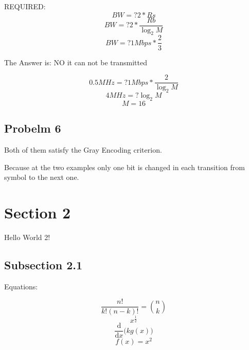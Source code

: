 \documentclass[a4paper,12pt]{report}
\begin{document}
        REQUIRED:
        \begin{equation*}
            BW =? 2 * Rs
        \end{equation*}
        \begin{equation*}
            BW =? 2 * \frac{Rb}{\log_2 M}
        \end{equation*}
        \begin{equation*}
            BW =? 1Mbps * \frac{2}{3}
        \end{equation*}

        The Answer is: NO it can not be transmitted
        
        \begin{equation*}
            0.5MHz =? 1Mbps * \frac{2}{\log_2 M}
        \end{equation*}
        \begin{equation*}
            4MHz =? \log_2 M
        \end{equation*}
        \begin{equation*}
            M = 16
        \end{equation*}
        
    \subsection{Probelm 6}
        Both of them satisfy the Gray Encoding criterion.

        Because at the two examples only one bit is changed in each transition from symbol to the next one.

    \section{Section 2}
    Hello World 2!

    \subsection{Subsection 2.1}
    Equations:
    
        \begin{equation}
            \frac{n!}{k!(n-k)!} = \binom{n}{k}  
        \end{equation}
        \begin{equation}
            x^\frac{1}{2}  
        \end{equation}
        \begin{equation}
            \frac{\mathrm d}{\mathrm d x} \big( k g(x) \big)
        \end{equation}
        \begin{equation*}
            f(x) = x^2
        \end{equation*}
    
\end{document}
